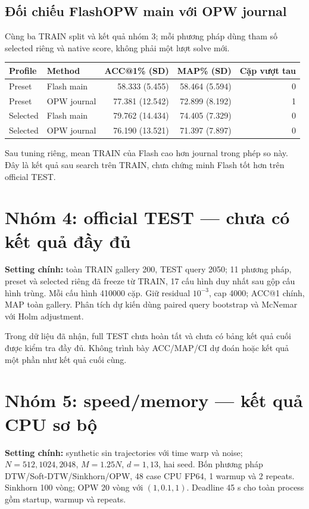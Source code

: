 \documentclass[11pt,a4paper]{article}
\begin{document}
\subsection{Đối chiếu FlashOPW main với OPW journal}
Cùng ba TRAIN split và kết quả nhóm 3; mỗi phương pháp dùng tham số selected
riêng và native score, không phải một lượt solve mới.
\begin{center}\small
\begin{tabular}{@{}llrrr@{}}
\toprule
Profile & Method & ACC@1\% (SD) & MAP\% (SD) & Cặp vượt tau \\
\midrule
Preset & Flash main & 58.333 (5.455) & 58.464 (5.594) & 0 \\
Preset & OPW journal & 77.381 (12.542) & 72.899 (8.192) & 1 \\
Selected & Flash main & 79.762 (14.434) & 74.405 (7.329) & 0 \\
Selected & OPW journal & 76.190 (13.521) & 71.397 (7.897) & 0 \\
\bottomrule
\end{tabular}
\end{center}
Sau tuning riêng, mean TRAIN của Flash cao hơn journal trong phép so này.
Đây là kết quả sau search trên TRAIN, chưa chứng minh Flash tốt hơn trên official TEST.

\section{Nhóm 4: official TEST --- chưa có kết quả đầy đủ}
\label{sec:g4}
\textbf{Setting chính:} toàn TRAIN gallery 200, TEST query 2050;
11 phương pháp, preset và selected riêng đã freeze từ TRAIN,
17 cấu hình duy nhất sau gộp cấu hình trùng. Mỗi cấu hình 410000 cặp.
Giữ residual $10^{-3}$, cap 4000; ACC@1 chính, MAP toàn gallery.
Phân tích dự kiến dùng paired query bootstrap và McNemar với Holm adjustment.

Trong dữ liệu đã nhận, full TEST chưa hoàn tất và chưa có bảng kết quả
cuối được kiểm tra đầy đủ. Không trình bày ACC/MAP/CI dự đoán hoặc kết quả
một phần như kết quả cuối cùng.

\section{Nhóm 5: speed/memory --- kết quả CPU sơ bộ}
\label{sec:g5}
\textbf{Setting chính:} synthetic sin trajectories với time warp và noise;
$N=512,1024,2048$, $M=1.25N$, $d=1,13$, hai seed.
Bốn phương pháp DTW/Soft-DTW/Sinkhorn/OPW, 48 case CPU FP64,
1 warmup và 2 repeats. Sinkhorn 100 vòng; OPW 20 vòng với $(1,0.1,1)$.
Deadline 45 s cho toàn process gồm startup, warmup và repeats.
\end{document}
